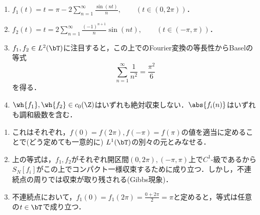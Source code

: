 \documentclass[uplatex,dvipdfmx]{jsreport}
\begin{document}
\begin{example}[恒等関数]\mbox{}
    \begin{enumerate}
        \item $f_1(t)=t=\pi-2\sum_{n=1}^\infty\frac{\sin(nt)}{n},\qquad (t\in(0,2\pi))$．
        \item $f_2(t)=t=2\sum_{n=1}^\infty\frac{(-1)^{n+1}}{n}\sin(nt),\qquad(t\in(-\pi,\pi))$．
        \item $f_1,f_2\in L^2(\bT)$に注目すると，この上でのFourier変換の等長性からBaselの等式
        \[\sum_{n=1}^\infty\frac{1}{n^2}=\frac{\pi^2}{6}\]
        を得る．
        \item $\wh{f_1},\wh{f_2}\in c_0(\Z)$はいずれも絶対収束しない．$\abs{f_i(n)}$はいずれも調和級数を含む．
    \end{enumerate}
    \begin{enumerate}[{注}1]
        \item これはそれぞれ，$f(0)=f(2\pi),f(-\pi)=f(\pi)$の値を適当に定めることで(どう定めても一意的に) $L^1(\bT)$の別々の元とみなせる．
        \item 上の等式は，$f_1,f_2$がそれぞれ開区間$(0,2\pi),(-\pi,\pi)$上で$C^1$-級であるから$S_N[f_i]$がこの上でコンパクト一様収束するために成り立つ．しかし，不連続点の周りでは収束が取り残される(Gibbs現象)．
        \item 不連続点において，$f_1(0)=f_1(2\pi)=\frac{0+2\pi}{2}=\pi$と定めると，等式は任意の$t\in\bT$で成り立つ．
    \end{enumerate}
\end{example}
\end{document}
